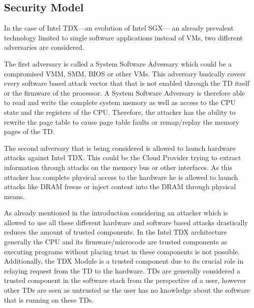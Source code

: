\documentclass[sigplan,screen,nonacm]{acmart}
\begin{document}
\subsection{Security Model}
\label{chap:secmodel}
In the case of Intel TDX---an evolution of Intel SGX--- an already prevalent technology limited to single software applications instead of VMs, two different adversaries are considered.

The first adversary is called a System Software Adversary which could be a compromised VMM, SMM, BIOS or other VMs.
This adversary basically covers every software based attack vector that that is not enabled through the TD itself or the firmware of the processor\cite[p. 8]{Intel-TDX-Whitepaper}.
A System Software Adversary is therefore able to read and write the complete system memory as well as access to the CPU state and the registers of the CPU.
Therefore, the attacker has the ability to rewrite the page table to cause page table faults or remap/replay the memory pages of the TD.

The second adversary that is being considered is allowed to launch hardware attacks against Intel TDX.
This could be the Cloud Provider trying to extract information through attacks on the memory bus or other interfaces.
As this attacker has complete physical access to the hardware he is allowed to launch attacks like DRAM freeze or inject content into the DRAM through physical means\cite[p. 8]{Intel-TDX-Whitepaper}.

As already mentioned in the introduction considering an attacker which is allowed to use all these different hardware and software based attacks drastically reduces the amount of trusted components.
In the Intel TDX architecture generally the CPU and its firmware/microcode are trusted components as executing programs without placing trust in these components is not possible.
Additionally, the TDX Module is a trusted component due to its crucial role in relaying request from the TD to the hardware.
TDs are generally considered a trusted component in the software stack from the perspective of a user, however other TDs are seen as untrusted as the user has no knowledge about the software that is running on these TDs. 
\end{document}
